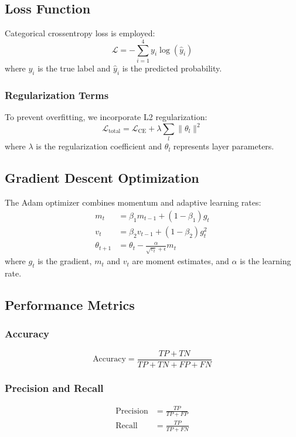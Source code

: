 \documentclass[conference,10pt,letterpaper]{IEEEtran}
\begin{document}
\subsection{Loss Function}

Categorical crossentropy loss is employed:
\begin{equation}
\mathcal{L} = -\sum_{i=1}^{4} y_i \log(\hat{y}_i)
\end{equation}
where $y_i$ is the true label and $\hat{y}_i$ is the predicted probability.

\subsubsection{Regularization Terms}
To prevent overfitting, we incorporate L2 regularization:
\begin{equation}
\mathcal{L}_{\text{total}} = \mathcal{L}_{\text{CE}} + \lambda \sum_{l} \|\theta_l\|^2
\end{equation}
where $\lambda$ is the regularization coefficient and $\theta_l$ represents layer parameters.

\subsection{Gradient Descent Optimization}

The Adam optimizer combines momentum and adaptive learning rates:
\begin{align}
m_t &= \beta_1 m_{t-1} + (1-\beta_1) g_t \\
v_t &= \beta_2 v_{t-1} + (1-\beta_2) g_t^2 \\
\theta_{t+1} &= \theta_t - \frac{\alpha}{\sqrt{v_t} + \epsilon} m_t
\end{align}
where $g_t$ is the gradient, $m_t$ and $v_t$ are moment estimates, and $\alpha$ is the learning rate.

\subsection{Performance Metrics}

\subsubsection{Accuracy}
\begin{equation}
\text{Accuracy} = \frac{TP + TN}{TP + TN + FP + FN}
\end{equation}

\subsubsection{Precision and Recall}
\begin{align}
\text{Precision} &= \frac{TP}{TP + FP} \\
\text{Recall} &= \frac{TP}{TP + FN}
\end{align}
\end{document}
